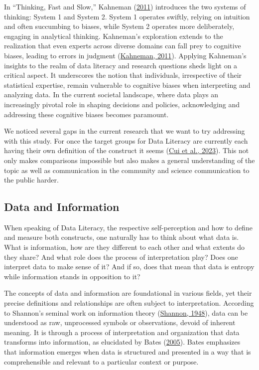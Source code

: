 \documentclass[
  12pt,
  a4paper,
  twoside]{article}
\begin{document}
In ``Thinking, Fast and Slow,'' Kahneman (\protect\hyperlink{ref-kahneman2011}{2011}) introduces the two systems of thinking: System 1 and System 2. System 1 operates swiftly, relying on intuition and often succumbing to biases, while System 2 operates more deliberately, engaging in analytical thinking. Kahneman's exploration extends to the realization that even experts across diverse domains can fall prey to cognitive biases, leading to errors in judgment (\protect\hyperlink{ref-kahneman2011}{Kahneman, 2011}).
Applying Kahneman's insights to the realm of data literacy and research questions sheds light on a critical aspect. It underscores the notion that individuals, irrespective of their statistical expertise, remain vulnerable to cognitive biases when interpreting and analyzing data. In the current societal landscape, where data plays an increasingly pivotal role in shaping decisions and policies, acknowledging and addressing these cognitive biases becomes paramount.

We noticed several gaps in the current research that we want to try addressing with this study. For once the target groups for Data Literacy are currently each having their own definition of the construct it seems (\protect\hyperlink{ref-Cui2023}{Cui et al., 2023}). This not only makes comparisons impossible but also makes a general understanding of the topic as well as communication in the community and science communication to the public harder.

\hypertarget{data-and-information}{%
\subsection{Data and Information}\label{data-and-information}}

When speaking of Data Literacy, the respective self-perception and how to define and measure both constructs, one naturally has to think about what data is. What is information, how are they different to each other and what extents do they share? And what role does the process of interpretation play? Does one interpret data to make sense of it? And if so, does that mean that data is entropy while information stands in opposition to it?

The concepts of data and information are foundational in various fields, yet their precise definitions and relationships are often subject to interpretation.
According to Shannon's seminal work on information theory (\protect\hyperlink{ref-shannon1948}{Shannon, 1948}), data can be understood as raw, unprocessed symbols or observations, devoid of inherent meaning. It is through a process of interpretation and organization that data transforms into information, as elucidated by Bates (\protect\hyperlink{ref-bates2005}{2005}). Bates emphasizes that information emerges when data is structured and presented in a way that is comprehensible and relevant to a particular context or purpose.
\end{document}
